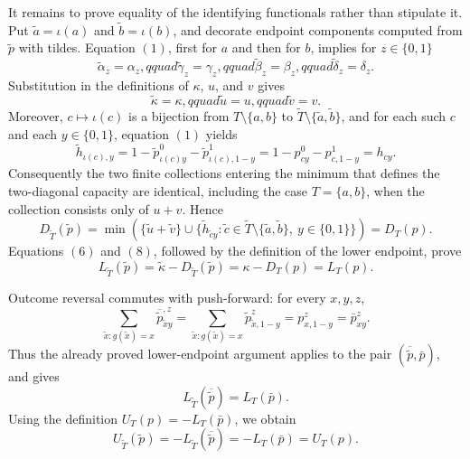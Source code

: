 It remains to prove equality of the identifying functionals rather than stipulate it.  Put \(\widetilde a=\iota(a)\) and \(\widetilde b=\iota(b)\), and decorate endpoint components computed from \(\widetilde p\) with tildes.  Equation \((1)\), first for \(a\) and then for \(b\), implies for \(z\in\{0,1\}\)
\[
 \widetilde\alpha_z=\alpha_z,qquad
 \widetilde\gamma_z=\gamma_z,qquad
 \widetilde\beta_z=\beta_z,qquad
 \widetilde\delta_z=\delta_z.                                    \tag{5}
\]
Substitution in the definitions of \(\kappa\), \(u\), and \(v\) gives
\[
 \widetilde\kappa=\kappa,qquad
 \widetilde u=u,qquad
 \widetilde v=v.                                                   \tag{6}
\]
Moreover, \(c\mapsto\iota(c)\) is a bijection from \(T\setminus\{a,b\}\) to \(\widetilde T\setminus\{\widetilde a,\widetilde b\}\), and for each such \(c\) and each \(y\in\{0,1\}\), equation \((1)\) yields
\[
 \widetilde h_{\iota(c),y}
 =1-\widetilde p^0_{\iota(c)y}
    -\widetilde p^1_{\iota(c),1-y}
 =1-p^0_{cy}-p^1_{c,1-y}
 =h_{cy}.                                                          \tag{7}
\]
Consequently the two finite collections entering the minimum that defines the two-diagonal capacity are identical, including the case \(T=\{a,b\}\), when the collection consists only of \(u+v\).  Hence
\[
 D_{\widetilde T}(\widetilde p)
 =\min\!\left(\{\widetilde u+\widetilde v\}
       \cup\{\widetilde h_{\widetilde c y}:
               \widetilde c\in\widetilde T\setminus
                    \{\widetilde a,\widetilde b\},\ y\in\{0,1\}\}\right)
 =D_T(p).                                                          \tag{8}
\]
Equations \((6)\) and \((8)\), followed by the definition of the lower endpoint, prove
\[
 L_{\widetilde T}(\widetilde p)
 =\widetilde\kappa-D_{\widetilde T}(\widetilde p)
 =\kappa-D_T(p)
 =L_T(p).                                                          \tag{9}
\]

Outcome reversal commutes with push-forward: for every \(x,y,z\),
\[
 \sum_{\widetilde x:g(\widetilde x)=x}
      \overline{\widetilde p}^{,z}_{\widetilde x y}
 =\sum_{\widetilde x:g(\widetilde x)=x}
      \widetilde p^z_{\widetilde x,1-y}
 =p^z_{x,1-y}
 =\bar p^z_{xy}.                                                   \tag{10}
\]
Thus the already proved lower-endpoint argument applies to the pair \((\overline{\widetilde p},\bar p)\), and gives
\[
 L_{\widetilde T}(\overline{\widetilde p})=L_T(\bar p).
\]
Using the definition \(U_T(p)=-L_T(\bar p)\), we obtain
\[
 U_{\widetilde T}(\widetilde p)
 =-L_{\widetilde T}(\overline{\widetilde p})
 =-L_T(\bar p)
 =U_T(p).                                                          \tag{11}
\]

